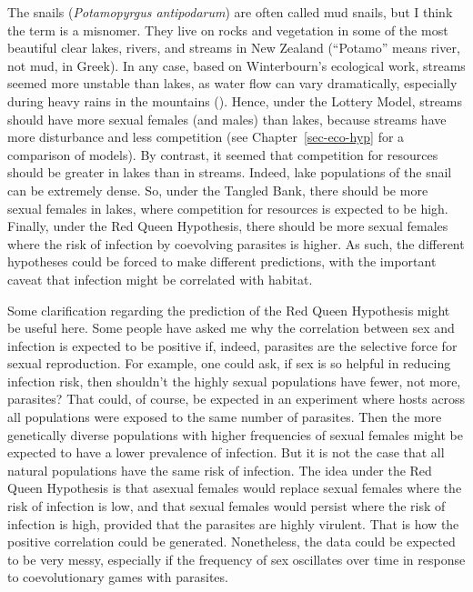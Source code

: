 \documentclass[
  letterpaper,
]{book}
\begin{document}
The snails (\emph{Potamopyrgus antipodarum}) are often called mud
snails, but I think the term is a misnomer. They live on rocks and
vegetation in some of the most beautiful clear lakes, rivers, and
streams in New Zealand (``Potamo'' means river, not mud, in Greek). In
any case, based on Winterbourn's ecological work, streams seemed more
unstable than lakes, as water flow can vary dramatically, especially
during heavy rains in the mountains
().
Hence, under the Lottery Model, streams should have more sexual females
(and males) than lakes, because streams have more disturbance and less
competition (see Chapter~\ref{sec-eco-hyp} for a comparison of models).
By contrast, it seemed that competition for resources should be greater
in lakes than in streams. Indeed, lake populations of the snail can be
extremely dense. So, under the Tangled Bank, there should be more sexual
females in lakes, where competition for resources is expected to be
high. Finally, under the Red Queen Hypothesis, there should be more
sexual females where the risk of infection by coevolving parasites is
higher. As such, the different hypotheses could be forced to make
different predictions, with the important caveat that infection might be
correlated with habitat.

Some clarification regarding the prediction of the Red Queen Hypothesis
might be useful here. Some people have asked me why the correlation
between sex and infection is expected to be positive if, indeed,
parasites are the selective force for sexual reproduction. For example,
one could ask, if sex is so helpful in reducing infection risk, then
shouldn't the highly sexual populations have fewer, not more, parasites?
That could, of course, be expected in an experiment where hosts across
all populations were exposed to the same number of parasites. Then the
more genetically diverse populations with higher frequencies of sexual
females might be expected to have a lower prevalence of infection. But
it is not the case that all natural populations have the same risk of
infection. The idea under the Red Queen Hypothesis is that asexual
females would replace sexual females where the risk of infection is low,
and that sexual females would persist where the risk of infection is
high, provided that the parasites are highly virulent. That is how the
positive correlation could be generated. Nonetheless, the data could be
expected to be very messy, especially if the frequency of sex oscillates
over time in response to coevolutionary games with parasites.
\end{document}
